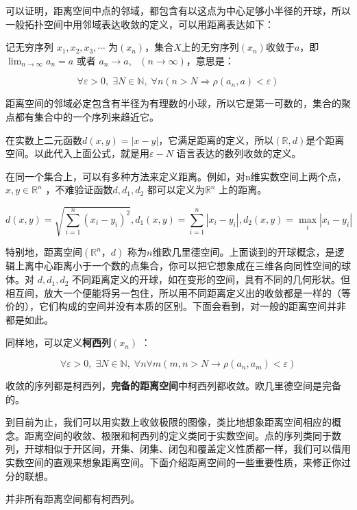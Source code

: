 可以证明，距离空间中点的邻域，都包含有以这点为中心足够小半径的开球，所以一般拓扑空间中用邻域表达收敛的定义，可以用距离表达如下：

\kaishu
\setlength{\leftskip}{1em}

记无穷序列 $ x_1,x_2,x_3,\cdots $ 为$ (x_n) $，集合$ X $上的无穷序列$ (x_n) $收敛于$ a $，即 $ \lim_{n \rightarrow \infty} a_n = a $ 或者 $ a_n \rightarrow a , \mbox{ } (n \rightarrow \infty) $，意思是：

\[\forall \varepsilon > 0, \;\exists N \in \mathbb{N},\;\forall n ( n>N \Rightarrow \rho (a_n,a) < \varepsilon )\]

\songti
\setlength{\leftskip}{0em}

距离空间的邻域必定包含有半径为有理数的小球，所以它是第一可数的，集合的聚点都有集合中的一个序列来趋近它。

在实数上二元函数$ d(x,y)=|x-y| $，它满足距离的定义，所以$ (\mathbb{R}, d) $是个距离空间。以此代入上面公式，就是用$ \varepsilon - N $ 语言表达的数列收敛的定义。

在同一个集合上，可以有多种方法来定义距离。例如，对n维实数空间上两个点，$ x,y \in \mathbb{R}^n $
，不难验证函数$ d, d_1, d_2 $ 都可以定义为$ \mathbb{R}^n $ 上的距离。

\[d(x,y)=\sqrt{\sum_{i=1}^n (x_i  −y_i)^2}, d_1(x,y)=\sum_{i=1}^{n}|x_i − y_i|, d_2(x,y)=\max_i{|x_i−y_i|}\]

特别地，距离空间$ (\mathbb{R}^n，d) $ 称为$ n $维欧几里德空间。上面谈到的开球概念，是逻辑上离中心距离小于一个数的点集合，你可以把它想象成在三维各向同性空间的球体。对 $ d, d_1, d_2 $ 不同距离定义的开球，如在变形的空间，具有不同的几何形状。但相互间，放大一个便能将另一包住，所以用不同距离定义出的收敛都是一样的（等价的），它们构成的空间并没有本质的区别。下面会看到，对一般的距离空间并非都是如此。

同样地，可以定义\textbf{柯西列}$ (x_n) $ ：

\[\forall \varepsilon >0, \; \exists N\in \mathbb{N}, \;\forall n \forall m(m,n>N \rightarrow \rho(a_n,a_m)<\varepsilon)\]

收敛的序列都是柯西列，\textbf{完备的距离空间}中柯西列都收敛。欧几里德空间是完备的。

到目前为止，我们可以用实数上收敛极限的图像，类比地想象距离空间相应的概念。距离空间的收敛、极限和柯西列的定义类同于实数空间。点的序列类同于数列，开球相似于开区间，开集、闭集、闭包和覆盖定义性质都一样，我们可以借用实数空间的直观来想象距离空间。下面介绍距离空间的一些重要性质，来修正你过分的联想。

并非所有距离空间都有柯西列。

